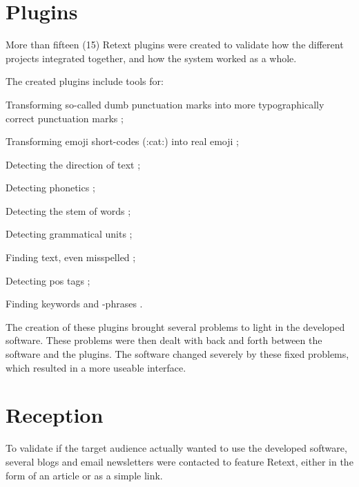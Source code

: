 \section{Plugins}\label{plugins}

More than fifteen (15) Retext plugins were created to validate how the
different projects integrated together, and how the system worked as a
whole.

The created plugins include tools for:

\begin{aenumerate}
\item
  Transforming so-called dumb punctuation marks into more
  typographically correct punctuation marks
  \autocite*{wooorm/retext-smartypants-source-code};
\item
  Transforming emoji short-codes (:cat:) into real emoji
  \autocite*{wooorm/retext-emoji-source-code};
\item
  Detecting the direction of text
  \autocite*{wooorm/retext-directionality-source-code};
\item
  Detecting phonetics
  \autocite*{wooorm/retext-double-metaphone-source-code};
\item
  Detecting the stem of words
  \autocite*{wooorm/retext-porter-stemmer-source-code};
\item
  Detecting grammatical units
  \autocite*{wooorm/retext-visit-source-code};
\item
  Finding text, even misspelled
  \autocite*{wooorm/retext-search-source-code};
\item
  Detecting \gls{pos} tags
  \autocite*{wooorm/retext-pos-source-code};
\item
  Finding keywords and -phrases
  \autocite*{wooorm/retext-keywords-source-code}.
\end{aenumerate}

The creation of these plugins brought several problems to light in the
developed software. These problems were then dealt with back and forth
between the software and the plugins. The software changed severely by
these fixed problems, which resulted in a more useable interface.

\section{Reception}\label{reception}

To validate if the target audience actually wanted to use the developed
software, several blogs and email newsletters were contacted to feature
Retext, either in the form of an article or as a simple link.

